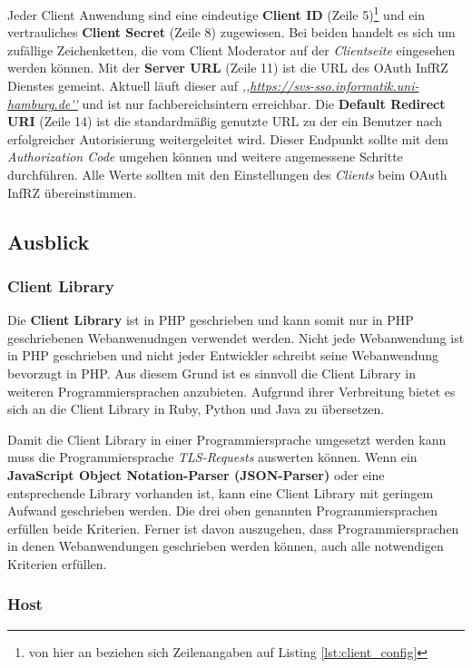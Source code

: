 \documentclass[12pt,a4paper,pointednumbers,abstracton]{scrartcl}
\begin{document}
Jeder Client Anwendung sind eine eindeutige \textbf{Client ID} (Zeile 5)\footnote{von hier an beziehen sich Zeilenangaben auf Listing \ref{lst:client_config}} und ein vertrauliches \textbf{Client Secret} (Zeile 8) zugewiesen.
Bei beiden handelt es sich um zufällige Zeichenketten, die vom Client Moderator auf der \emph{Clientseite} eingesehen werden können.
Mit der \textbf{Server URL} (Zeile 11) ist die URL des OAuth InfRZ Dienstes gemeint.
Aktuell läuft dieser auf \emph{,,\url{https://svs-sso.informatik.uni-hamburg.de''}} und ist nur fachbereichsintern erreichbar.
Die \textbf{Default Redirect URI} (Zeile 14) ist die standardmäßig genutzte URL zu der ein Benutzer nach erfolgreicher Autorisierung weitergeleitet wird.
Dieser Endpunkt sollte mit dem \emph{Authorization Code} umgehen können und weitere angemessene Schritte durchführen.
Alle Werte sollten mit den Einstellungen des \emph{Clients} beim OAuth InfRZ übereinstimmen.

\subsection{Ausblick}

\subsubsection{Client Library}

Die \textbf{Client Library} ist in PHP geschrieben und kann somit nur in PHP geschriebenen Webanwenudngen verwendet werden.
Nicht jede Webanwendung ist in PHP geschrieben und nicht jeder Entwickler schreibt seine Webanwendung bevorzugt in PHP.
Aus diesem Grund ist es sinnvoll die Client Library in weiteren Programmiersprachen anzubieten.
Aufgrund ihrer Verbreitung bietet es sich an die Client Library in Ruby, Python und Java zu übersetzen.

Damit die Client Library in einer Programmiersprache umgesetzt werden kann muss die Programmiersprache \emph{TLS-Requests} auswerten können.
Wenn ein \textbf{JavaScript Object Notation-Parser (JSON-Parser)} oder eine entsprechende Library vorhanden ist, kann eine Client Library mit geringem Aufwand geschrieben werden.
Die drei oben genannten Programmiersprachen erfüllen beide Kriterien.
Ferner ist davon auszugehen, dass Programmiersprachen in denen Webanwendungen geschrieben werden können, auch alle notwendigen Kriterien erfüllen. 

\subsubsection{Host}
\label{sec:oauth-infrz/host}
\end{document}
